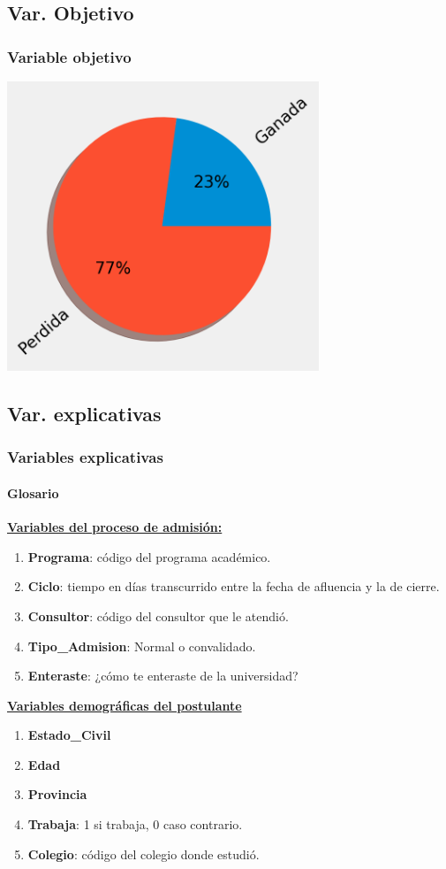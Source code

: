 \documentclass[aspectratio=149]{beamer}
\begin{document}
\subsection{Var. Objetivo}
\begin{frame}
	\frametitle{Variable objetivo}
	\centering
	\includegraphics[width=0.7\textwidth]{conversion.png} \\
\end{frame}


\subsection{Var. explicativas}
\begin{frame}
	\frametitle{Variables explicativas}
	\framesubtitle{Glosario}
	\underline{\textbf{Variables del proceso de admisión:}}
	\begin{enumerate}
		\item \textbf{Programa}: código del programa académico.
		\item \textbf{Ciclo}: tiempo en días transcurrido entre la fecha de afluencia y la de cierre.
		\item \textbf{Consultor}: código del consultor que le atendió.
		\item \textbf{Tipo\_Admision}: Normal o convalidado.
		\item \textbf{Enteraste}: ¿cómo te enteraste de la universidad?
	\end{enumerate}
	
	\underline{\textbf{Variables demográficas del postulante}}
	\begin{enumerate}
		\item \textbf{Estado\_Civil}
		\item \textbf{Edad}
		\item \textbf{Provincia}
		\item \textbf{Trabaja}: 1 si trabaja, 0 caso contrario.
		\item \textbf{Colegio}: código del colegio donde estudió.
	\end{enumerate}
\end{frame}
\end{document}
